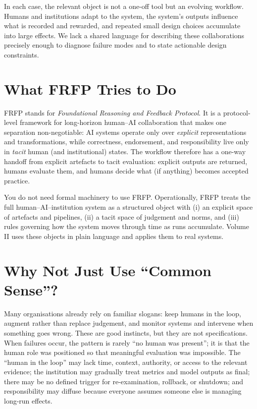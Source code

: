 In each case, the relevant object is not a one-off tool but an evolving workflow. Humans and institutions adapt to the system, the system’s outputs influence what is recorded and rewarded, and repeated small design choices accumulate into large effects. We lack a shared language for describing these collaborations precisely enough to diagnose failure modes and to state actionable design constraints.

\section{What FRFP Tries to Do}

FRFP stands for \emph{Foundational Reasoning and Feedback Protocol}. It is a protocol-level framework for long-horizon human--AI collaboration that makes one separation non-negotiable: AI systems operate only over \emph{explicit} representations and transformations, while correctness, endorsement, and responsibility live only in \emph{tacit} human (and institutional) states. The workflow therefore has a one-way handoff from explicit artefacts to tacit evaluation: explicit outputs are returned, humans evaluate them, and humans decide what (if anything) becomes accepted practice.

You do not need formal machinery to use FRFP. Operationally, FRFP treats the full human--AI--institution system as a structured object with (i) an explicit space of artefacts and pipelines, (ii) a tacit space of judgement and norms, and (iii) rules governing how the system moves through time as runs accumulate. Volume II uses these objects in plain language and applies them to real systems.

\section{Why Not Just Use ``Common Sense''?}

Many organisations already rely on familiar slogans: keep humans in the loop, augment rather than replace judgement, and monitor systems and intervene when something goes wrong. These are good instincts, but they are not specifications. When failures occur, the pattern is rarely ``no human was present''; it is that the human role was positioned so that meaningful evaluation was impossible. The ``human in the loop'' may lack time, context, authority, or access to the relevant evidence; the institution may gradually treat metrics and model outputs as final; there may be no defined trigger for re-examination, rollback, or shutdown; and responsibility may diffuse because everyone assumes someone else is managing long-run effects.

